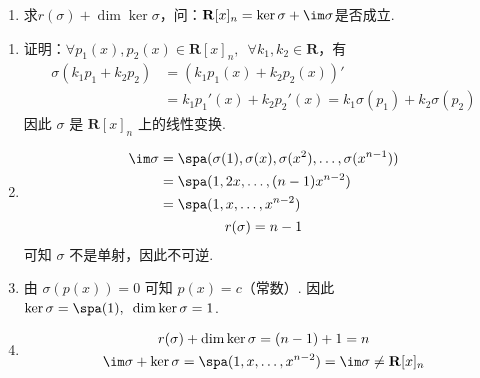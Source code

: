 \begin{exercise}
\begin{exgroup}
\begin{enumerate}
            \item 求$r(\sigma)+\dim\ker\sigma$，问：$\mathbf{R}[x]_n=\ker\sigma+\im \sigma$是否成立.
        \end{enumerate}
        \begin{answer}
            \begin{enumerate}
                \item 证明：$ \forall p_1(x), p_2(x) \in \mathbf{R}[x]_n,\enspace \forall k_1, k_2 \in \mathbf{R} $，有
                      \begin{align*}
                          \sigma(k_1 p_1 + k_2 p_2) & = (k_1 p_1(x) + k_2 p_2(x))'                                    \\
                                                    & = k_1 p_1'(x) + k_2 p_2'(x) = k_1 \sigma(p_1) + k_2 \sigma(p_2)
                      \end{align*}
                      因此 $ \sigma $ 是 $ \mathbf{R}[x]_n $ 上的线性变换.

                \item \begin{gather*}
                          \begin{aligned}
                              \im \sigma & = \spa(\sigma(1), \sigma(x), \sigma(x^2), \ldots, \sigma(x^{n - 1})) \\
                                         & = \spa(1, 2x, \ldots, (n - 1) x^{n - 2})                             \\
                                         & = \spa(1, x, \ldots, x^{n - 2})
                          \end{aligned} \\
                          r(\sigma) = n - 1
                      \end{gather*}
                      可知 $ \sigma $ 不是单射，因此不可逆.

                \item 由 $ \sigma(p(x)) = 0 $ 可知 $ p(x) = c $（常数）. 因此 $ \ker \sigma = \spa(1),\enspace \dim \ker \sigma = 1 $.

                \item \begin{gather*}
                          r(\sigma) + \dim \ker \sigma = (n - 1) + 1 = n \\
                          \im \sigma + \ker \sigma = \spa(1, x, \ldots, x^{n - 2}) = \im \sigma \neq \mathbf{R}[x]_n
                      \end{gather*}
            \end{enumerate}
        \end{answer}


\end{exgroup}
\end{exercise}
